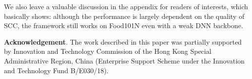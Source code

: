 \documentclass[runningheads]{llncs}
\begin{document}
We also leave a valuable discussion in the appendix for readers of interests, which basically shows: although the performance is largely dependent on the quality of SCC, the framework still works on Food101N even with a weak DNN backbone.

\bigskip
\noindent\textbf{Acknowledgement}. 
The work described in this paper was partially supported by Innovation and Technology Commission of the Hong Kong Special Administrative Region, China (Enterprise Support Scheme under the Innovation and Technology Fund B/E030/18).
	
\clearpage
%
%







\end{document}
